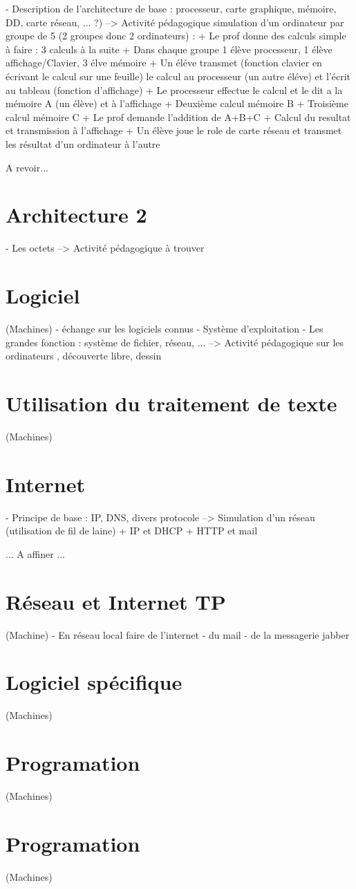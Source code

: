 \documentclass[a4paper,11pt]{report}
\begin{document}
- Description de l'architecture de base : processeur, carte graphique, mémoire, DD, carte réseau, ... ?)
--> Activité pédagogique simulation d'un ordinateur par groupe de 5 (2 groupes donc 2 ordinateurs) :
    + Le prof donne des calculs simple à faire : 3 calculs à la suite
    + Dans chaque groupe 1 élève processeur, 1 élève affichage/Clavier, 3 élve mémoire
    + Un éléve transmet (fonction clavier en écrivant le calcul sur une feuille) le calcul au processeur (un autre éléve) et l'écrit au tableau (fonction d'affichage)
    + Le processeur effectue le calcul et le dit a la mémoire A (un élève) et à l'affichage
    + Deuxième calcul mémoire B
    + Troisième calcul mémoire C
    + Le prof demande l'addition de A+B+C
    + Calcul du resultat et transmission à l'affichage
    + Un élève joue le role de carte réseau et transmet les résultat d'un ordinateur à l'autre

A revoir...

\section{Architecture 2}

- Les octets
--> Activité pédagogique à trouver

\section{Logiciel}
 
(Machines)
- échange sur les logiciels connus
- Système d'exploitation
- Les grandes fonction : système de fichier, réseau, ...
--> Activité pédagogique sur les ordinateurs , découverte libre, dessin

\section{Utilisation du traitement de texte}
 
(Machines)

\section{Internet}

- Principe de base : IP, DNS, divers protocole
--> Simulation d'un réseau (utilisation de fil de laine)
  + IP et DHCP
  + HTTP et mail 

... A affiner ...

\section{Réseau et Internet TP}
 
(Machine)
- En réseau local faire de l'internet
- du mail
- de la messagerie jabber

\section{Logiciel spécifique}
 
(Machines)

\section{Programation}
 
(Machines)

\section{Programation}
 
(Machines)
\end{document}
